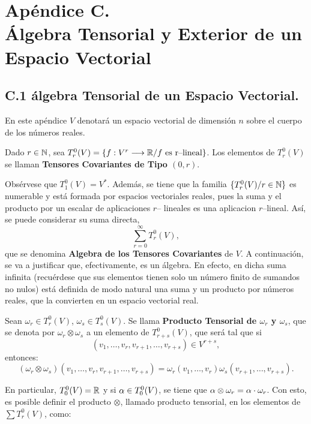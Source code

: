 \documentclass[cursovd_portada.tex]{subfiles}
\begin{document}
\chapter*{Apéndice C.\\\'Algebra Tensorial y Exterior de un Espacio Vectorial}
\section*{C.1 álgebra Tensorial de un Espacio Vectorial.}
 \hs En este apéndice
$V$ denotará un espacio vectorial de dimensión $n$ sobre el cuerpo de los números reales.
\begin{defiap}
Dado $r\in\mathbb{N}$, sea $T^0_r(V)=\{f:V^r\longrightarrow\mathbb{R} / f \mbox{ es r--lineal}\}$. Los elementos de $T^0_r(V)$ se llaman {\bf
Tensores Covariantes de Tipo $(0,r)$}.
\end{defiap}
\par\bigskip
Obsérvese que $T^0_1(V)=V^*$. Además, se tiene que la familia $\{T^0_r(V)/r\in\mathbb{N}\}$ es numerable y está formada
por espacios vectoriales reales, pues la suma y el producto por un escalar de aplicaciones $r$-- lineales es una
aplicacion $r$--lineal. Así, se puede considerar su suma directa,
$$\sum_{r=0}^\infty T^0_r(V),$$
que se denomina {\bf Algebra de los Tensores Covariantes} de $V$. A con\-ti\-nua\-ción, se va a justificar que,
efectivamente, es un álgebra. En efecto, en dicha suma infinita (recuérdese que sus elementos tienen solo un
número finito de sumandos no nulos) está definida de modo natural una suma y un producto por números reales, que
la convierten en un espacio vectorial real.
\begin{defiap}
Sean $\omega_r\in T^0_r(V)$, $\omega_s\in T^0_s(V)$. Se llama {\bf Producto Tensorial de $\omega_r$ y $\omega_s$},
que se denota por $\omega_r\otimes \omega_s$ a un elemento de $T^0_{r+s}(V)$, que será tal que si
$$(v_1,\dots ,v_r,v_{r+1},\dots ,v_{r+s})\in V^{r+s},$$
entonces:
$$(\omega_r\otimes\omega_s)(v_1,\dots ,v_r,v_{r+1},\dots ,v_{r+s})=
\omega_r(v_1,\dots ,v_r)\omega_s(v_{r+1},\dots,v_{r+s}).$$
\end{defiap}
\par\bigskip
En particular, $T_0^0(V)=\mathbb{R}$ y si $\alpha\in T^0_0(V)$, se tiene que $\alpha\otimes \omega_r=\alpha\cdot\omega_r$. Con esto,
es posible definir el producto $\otimes$, llamado producto tensorial, en los elementos de $\sum T^0_r(V)$, como:
\end{document}
